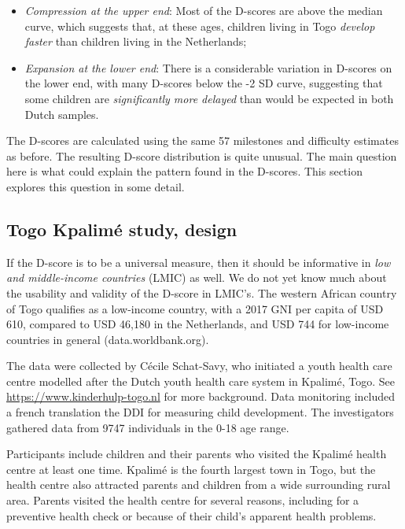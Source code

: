 \documentclass[
]{book}
\begin{document}
\begin{itemize}
\item
  \emph{Compression at the upper end}: Most of the D-scores are above the median curve, which suggests that, at these ages, children living in Togo \emph{develop faster} than children living in the Netherlands;
\item
  \emph{Expansion at the lower end}: There is a considerable variation in D-scores on the lower end, with many D-scores below the -2 SD curve, suggesting that some children are \emph{significantly more delayed} than would be expected in both Dutch samples.
\end{itemize}

The D-scores are calculated using the same 57 milestones and difficulty estimates as before. The resulting D-score distribution is quite unusual. The main question here is what could explain the pattern found in the D-scores. This section explores this question in some detail.

\hypertarget{togo-kpalimuxe9-study-design}{%
\subsection{Togo Kpalimé study, design}\label{togo-kpalimuxe9-study-design}}

If the D-score is to be a universal measure, then it should be informative in \emph{low and middle-income countries} (LMIC) as well. We do not yet know much about the usability and validity of the D-score in LMIC's. The western African country of Togo qualifies as a low-income country, with a 2017 GNI per capita of USD 610, compared to USD 46,180 in the Netherlands, and USD 744 for low-income countries in general (data.worldbank.org).

The data were collected by Cécile Schat-Savy, who initiated a youth health care centre modelled after the Dutch youth health care system in Kpalimé, Togo. See \url{https://www.kinderhulp-togo.nl} for more background. Data monitoring included a french translation the DDI for measuring child development. The investigators gathered data from 9747 individuals in the 0-18 age range.

Participants include children and their parents who visited the Kpalimé health centre at least one time. Kpalimé is the fourth largest town in Togo, but the health centre also attracted parents and children from a wide surrounding rural area. Parents visited the health centre for several reasons, including for a preventive health check or because of their child's apparent health problems.
\end{document}
